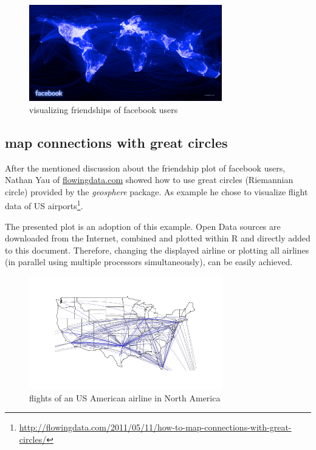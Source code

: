\documentclass{ifacconf}
\begin{document}
\begin{figure}[h]
\begin{center}
\includegraphics[width=8.4cm]{pics/facebook.png}    %
\caption{visualizing friendships of facebook users} 
\label{fig:facebook}
\end{center}
\end{figure}

\subsection{map connections with great circles}
After the mentioned discussion about the friendship plot of facebook users,
Nathan Yau of \url{flowingdata.com} showed how to use great circles
(Riemannian circle) provided by the \textit{geosphere} package. As example he chose to
visualize flight data of US 
airports\footnote{\url{http://flowingdata.com/2011/05/11/how-to-map-connections-with-great-circles/}}.

The presented plot is an adoption of this example. Open Data sources are downloaded from
the Internet, combined and plotted within R and directly added to this document.
Therefore, changing the displayed airline or plotting all airlines (in parallel using
multiple processors simultaneously), can be easily achieved.


\begin{figure}[h]
\begin{center}
\includegraphics[width=8.4cm]{pics/flights.png}    %
\caption{flights of an US American airline in North America} 
\label{fig:flights}
\end{center}
\end{figure}
\end{document}
